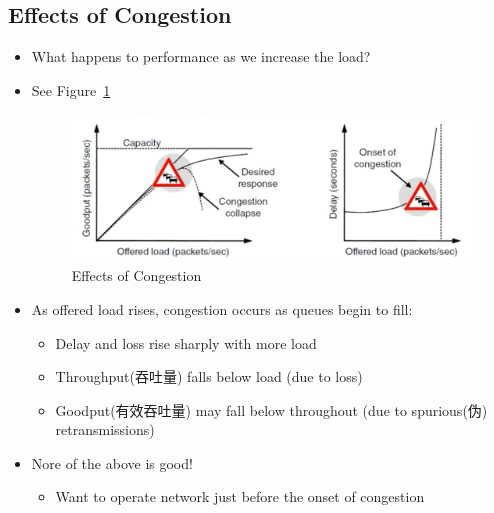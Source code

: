 \documentclass[12pt]{ctexart}   %
\begin{document}
	\subsection{Effects of Congestion}
	\begin{itemize}
		\item What happens to performance as we increase the load?
		\item See Figure~\ref{fig:7-1-3}
		  
		 \begin{figure}[h!] %
		\centering
		 \includegraphics[scale=0.7]{images/7-1-3}
		\caption{ Effects of Congestion}
		 \label{fig:7-1-3}
		 \end{figure}
		 
		 \item As offered load rises, congestion occurs as queues begin to fill:
		 \begin{itemize}
		 	\item Delay and loss rise sharply with more load
		 	\item Throughput(吞吐量) falls below load (due to loss)
		 	\item Goodput(有效吞吐量) may fall below throughout (due to spurious(伪) retransmissions)
		 \end{itemize}
		 
		 \item Nore of the above is good!
		 \begin{itemize}
		 	\item Want to operate network just before the onset of congestion
		 \end{itemize}
	\end{itemize}
	
\end{document}
